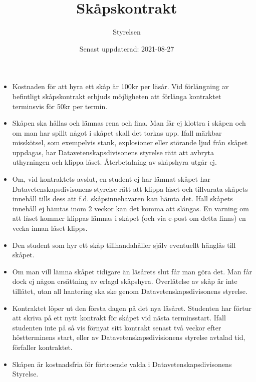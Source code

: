 \documentclass{dvd}
\begin{document}
	\title{Skåpskontrakt}
	\author{Styrelsen}
	\date{Senast uppdaterad: 2021-08-27}

	\begin{itemize}
	    \item Kostnaden för att hyra ett skåp är 100kr per läsår.
	    Vid förlängning av befintligt skåpskontrakt erbjuds möjligheten att förlänga kontraktet terminsvis för 50kr per termin.

	    \item Skåpen ska hållas och lämnas rena och fina.
	    Man får ej klottra i skåpen och om man har spillt något i skåpet skall det torkas upp. Ifall märkbar misskötsel, som exempelvis stank, explosioner eller störande ljud från skåpet uppdagas, har Datavetenskapsdivisonens styrelse rätt att avbryta uthyrningen och klippa låset.
	    Återbetalning av skåpshyra utgår ej.

	    \item Om, vid kontraktets avslut, en student ej har lämnat skåpet har Datavetenskapsdivisonens styrelse rätt att klippa låset och tillvarata skåpets innehåll tills dess att f.d. skåpsinnehavaren kan hämta det.
	    Ifall skåpets innehåll ej hämtas inom 2 veckor kan det komma att slängas.
	    En varning om att låset kommer klippas lämnas i skåpet (och via e-post om detta finns) en vecka innan låset klipps.

	    \item Den student som hyr ett skåp tillhandahåller själv eventuellt hänglås till skåpet.

	    \item Om man vill lämna skåpet tidigare än läsårets slut får man göra det.
	    Man får dock ej någon ersättning av erlagd skåpshyra.
	    Överlåtelse av skåp är inte tillåtet, utan all hantering ska ske genom Datavetenskapsdivisonens styrelse.

	    \item  Kontraktet löper ut den första dagen på det nya läsåret.
	    Studenten har förtur att skriva på ett nytt kontrakt för skåpet vid nästa terminsstart.
	    Ifall studenten inte på så vis förnyat sitt kontrakt senast två veckor efter höstterminens start, eller av Datavetenskapsdivisionens styrelse avtalad tid, förfaller kontraktet.

	    \item Skåpen är kostnadsfria för förtroende valda i Datavetenskapsdivisonens Styrelse.
	\end{itemize}
\end{document}
